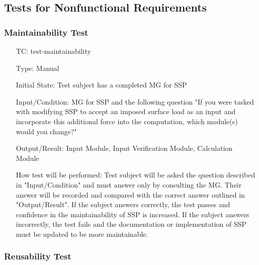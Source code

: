 \documentclass[12pt, titlepage]{article}
\newcounter{testnum} %
\newcommand{\progname}{SSP}
\begin{document}
\subsection{Tests for Nonfunctional Requirements} \label{sec_NFRTests}

\subsubsection{Maintainability Test} \label{sec_Maintainability}

\begin{enumerate}[label=TC\arabic*:,ref={\arabic*}]
	
\item [TC\refstepcounter{testnum}\thetestnum: \label{TC_Maintainability}] 
test-maintainability

Type: Manual
					
Initial State: Test subject has a completed MG for \progname{}
					
Input/Condition: MG for \progname{} and the following question "If you were 
tasked with modifying \progname{} to accept an imposed surface load as an input 
and incorporate this additional force into the computation, which module(s) 
would you change?"
					
Output/Result: Input Module, Input Verification Module, Calculation Module

					
How test will be performed: Test subject will be asked the question described 
in "Input/Condition" and must answer only by consulting the MG. Their answer 
will be recorded and compared with the correct answer outlined in 
"Output/Result". If the subject answers correctly, the test passes and 
confidence in the maintainability of \progname{} is increased. If the subject 
answers incorrectly, the test fails and the documentation or implementation of 
\progname{} must be updated to be more maintainable.
					
\end{enumerate}


\subsubsection{Reusability Test} \label{sec_Reusability}
\end{document}
